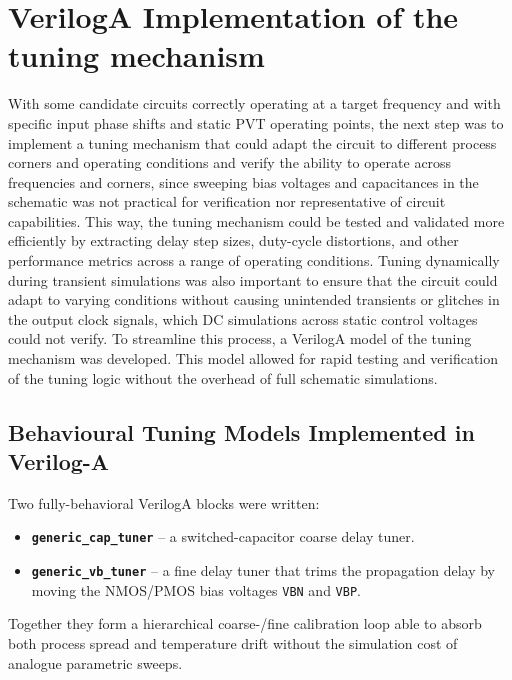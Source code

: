 \section{VerilogA Implementation of the tuning mechanism}\label{sec:RTL_tuning}
With some candidate circuits correctly operating at a target frequency and with specific input phase shifts and static PVT operating points, the next step was to implement a tuning mechanism that could adapt the circuit to different process corners and operating conditions and verify the ability to operate across frequencies and corners, since sweeping bias voltages and capacitances in the schematic was not practical for verification nor representative of circuit capabilities.
This way, the tuning mechanism could be tested and validated more efficiently by extracting delay step sizes, duty-cycle distortions, and other performance metrics across a range of operating conditions. Tuning dynamically during transient simulations was also important to ensure that the circuit could adapt to varying conditions without causing unintended transients or glitches in the output clock signals, which DC simulations across static control voltages could not verify.
To streamline this process, a VerilogA model of the tuning mechanism was developed. This model allowed for rapid testing and verification of the tuning logic without the overhead of full schematic simulations.


\subsection{Behavioural Tuning Models Implemented in Verilog-A}
\label{sec:veriloga_tuners}

Two fully-behavioral VerilogA blocks were written:

\begin{itemize}
  \item \textbf{\texttt{generic\_cap\_tuner}} – a switched-capacitor coarse delay tuner.
  \item \textbf{\texttt{generic\_vb\_tuner}} – a fine delay tuner that trims the propagation delay by moving the NMOS/PMOS bias voltages \texttt{VBN} and \texttt{VBP}.
\end{itemize}

Together they form a hierarchical coarse-/fine calibration loop able to absorb both process spread and temperature drift without the simulation cost of analogue parametric sweeps.

